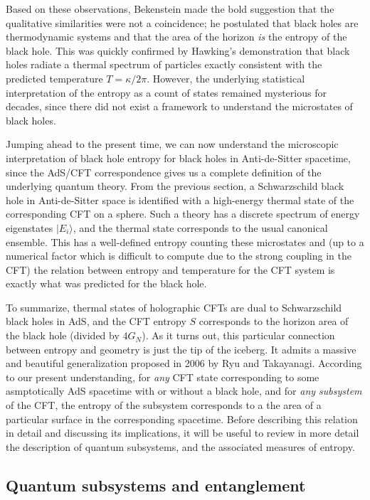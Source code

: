 \documentclass[12pt,epsf]{article}
\begin{document}
Based on these observations, Bekenstein made the bold suggestion that the qualitative similarities were not a coincidence; he postulated that black holes are thermodynamic systems and that the area of the horizon {\it is} the entropy of the black hole. This was quickly confirmed by Hawking's demonstration \cite{hawking1975particle} that black holes radiate a thermal spectrum of particles exactly consistent with the predicted temperature $T = \kappa / 2 \pi$. However, the underlying statistical interpretation of the entropy as a count of states remained mysterious for decades, since there did not exist a framework to understand the microstates of black holes.

Jumping ahead to the present time, we can now understand the microscopic interpretation of black hole entropy for black holes in Anti-de-Sitter spacetime, since the AdS/CFT correspondence gives us a complete definition of the underlying quantum theory. From the previous section, a Schwarzschild black hole in Anti-de-Sitter space is identified with a high-energy thermal state of the corresponding CFT on a sphere. Such a theory has a discrete spectrum of energy eigenstates $|E_i \rangle$, and the thermal state corresponds to the usual canonical ensemble. This has a well-defined entropy counting these microstates and (up to a numerical factor which is difficult to compute due to the strong coupling in the CFT) the relation between entropy and temperature for the CFT system is exactly what was predicted for the black hole.

To summarize, thermal states of holographic CFTs are dual to Schwarzschild black holes in AdS, and the CFT entropy $S$ corresponds to the horizon area of the black hole (divided by $4 G_N$). As it turns out, this particular connection between entropy and geometry is just the tip of the iceberg. It admits a massive and beautiful generalization proposed in 2006 by Ryu and Takayanagi. According to our present understanding, for {\it any} CFT state corresponding to some asmptotically AdS spacetime with or without a black hole, and for {\it any subsystem} of the CFT, the entropy of the subsystem corresponds to a the area of a particular surface in the corresponding spacetime. Before describing this relation in detail and discussing its implications, it will be useful to review in more detail the description of quantum subsystems, and the associated measures of entropy.

\subsection{Quantum subsystems and entanglement}
\end{document}
